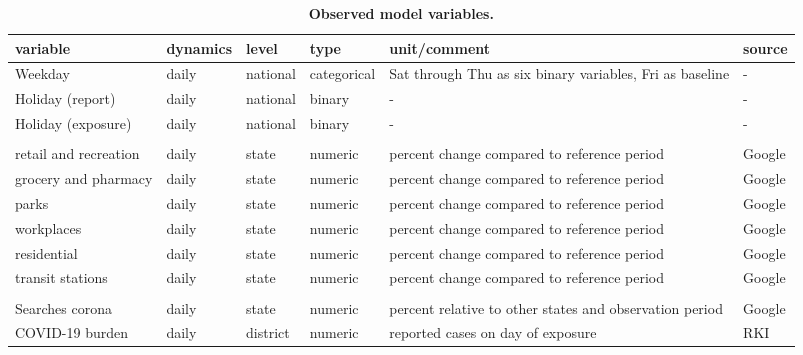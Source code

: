 \documentclass[10pt,letterpaper]{article}
\providecommand{\DIFaddbegin}{} %
\providecommand{\DIFdelend}{} %
\newcommand{\DIFaddincludegraphics}[2][]{{\color{blue}\fbox{\DIFOincludegraphics[#1]{#2}}}} %
\DeclareRobustCommand{\DIFaddbegin}{\DIFOaddbegin \let\includegraphics\DIFaddincludegraphics} %
\DeclareRobustCommand{\DIFdelend}{\DIFOaddend \let\includegraphics\DIFOincludegraphics} %
\begin{document}
\DIFdelend \DIFaddbegin \begin{table}[!ht]
\begin{adjustwidth}{-2.25in}{0in} %
\centering
\caption{
{\bf Observed model variables.}}
\fontsize{8}{10}\selectfont
\begin{tabular}[t]{llll>{\raggedright\arraybackslash}p{20em}l}
\toprule
variable & dynamics & level & type & unit/comment & source\\
\midrule
Weekday & daily & national & categorical & Sat through Thu as six binary variables, Fri as baseline & -\\
Holiday (report) & daily & national & binary & - & -\\
Holiday (exposure) & daily & national & binary & - & -\\
\addlinespace[0.3em]
\multicolumn{6}{l}{\textbf{Mobility}}\\
\hspace{1em}retail and recreation & daily & state & numeric & percent change compared to reference period & Google \cite{google_mobility}\\
\hspace{1em}grocery and pharmacy & daily & state & numeric & percent change compared to reference period & Google \cite{google_mobility}\\
\hspace{1em}parks & daily & state & numeric & percent change compared to reference period & Google \cite{google_mobility}\\
\hspace{1em}workplaces & daily & state & numeric & percent change compared to reference period & Google \cite{google_mobility}\\
\hspace{1em}residential & daily & state & numeric & percent change compared to reference period & Google \cite{google_mobility}\\
\hspace{1em}transit stations & daily & state & numeric & percent change compared to reference period & Google \cite{google_mobility}\\
\addlinespace[0.3em]
\multicolumn{6}{l}{\textbf{Awareness}}\\
\hspace{1em}Searches corona & daily & state & numeric & percent relative to other states and observation period & Google \cite{google_trends}\\
\hspace{1em}COVID-19 burden & daily & district & numeric & reported cases on day of exposure & RKI \cite{casenumbers_rki}\\

\end{tabular}
\end{adjustwidth}
\end{table}
\end{document}
